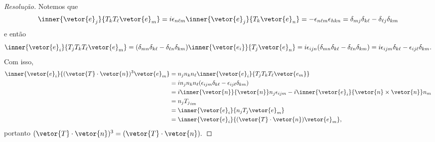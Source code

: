 \begin{proof}[Resolução]
   Notemos que 
   \begin{equation*}
      \inner{\vetor{e}_j}{T_k T_{\ell} \vetor{e}_m} = i \epsilon_{n \ell m}\inner{\vetor{e}_j}{T_k \vetor{e}_n} = - \epsilon_{n \ell m} \epsilon_{h k n} = \delta_{mj} \delta_{k\ell} - \delta_{\ell j} \delta_{km}
   \end{equation*}
   e então
   \begin{equation*}
      \inner{\vetor{e}_i}{T_j T_k T_{\ell} \vetor{e}_m} = (\delta_{mn} \delta_{k\ell} - \delta_{\ell n} \delta_{km}) \inner{\vetor{e_i}}{T_j \vetor{e}_n} = i\epsilon_{i j n}(\delta_{mn} \delta_{k\ell} - \delta_{\ell n} \delta_{km}) = i\epsilon_{ijm} \delta_{k\ell} - \epsilon_{ij \ell} \delta_{km}.
   \end{equation*}
   Com isso,
   \begin{align*}
      \inner{\vetor{e}_i}{(\vetor{T} \cdot \vetor{n})^3\vetor{e}_m} 
      &= n_j n_k n_\ell \inner{\vetor{e}_i}{T_j T_k T_\ell \vetor{e_m}}\\
      &= in_j n_k n_\ell (\epsilon_{ijm} \delta_{k\ell} - \epsilon_{ij\ell} \delta_{km})\\
      &= i\inner{\vetor{n}}{\vetor{n}} n_j \epsilon_{ijm} - i\inner{\vetor{e}_i}{\vetor{n}\times \vetor{n}} n_m\\
      &=  n_j {T_j}_{im}\\
      &= \inner{\vetor{e}_i}{n_jT_j \vetor{e}_m}\\
      &= \inner{\vetor{e}_i}{(\vetor{T} \cdot \vetor{n})\vetor{e}_m},
   \end{align*}
   portanto \((\vetor{T} \cdot \vetor{n})^3 = (\vetor{T} \cdot \vetor{n}).\) 


\end{proof}
